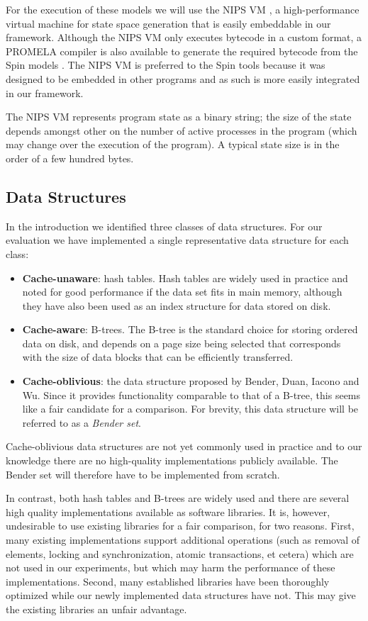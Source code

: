 \documentclass{acm_proc_article-sp}
\begin{document}
For the execution of these models we will use the NIPS VM \cite{weber2007evm}, a
high-performance virtual machine for state space generation that is easily
embeddable in our framework. Although the NIPS VM only executes bytecode in a
custom format, a PROMELA compiler is also available to generate the required
bytecode from the Spin models \cite{nipsvm}. The NIPS VM is preferred to the
Spin tools because it was designed to be embedded in other programs and as
such is more easily integrated in our framework.

The NIPS VM represents program state as a binary string; the size of the state
depends amongst other on the number of active processes in the program (which
may change over the execution of the program).
A typical state size is in the order of a few hundred bytes.

\subsection{Data Structures}
In the introduction we identified three classes of data structures.
For our evaluation we have implemented a single representative data structure
for each class:
\begin{itemize}
\item \textbf{Cache-unaware}: hash tables. Hash tables are widely used in practice and noted for good performance if the data set fits in main memory, although they have also been used as an index structure for data stored on disk.
\item \textbf{Cache-aware}: B-trees. The B-tree is the standard choice for storing ordered data on disk, and depends on a page size being selected that corresponds with the size of data blocks that can be efficiently transferred.
\item \textbf{Cache-oblivious}: the data structure proposed by Bender, Duan, Iacono and Wu. Since it provides functionality comparable to that of a B-tree, this seems like a fair candidate for a comparison. For brevity, this data structure will be referred to as a \emph{Bender set}.
\end{itemize}

Cache-oblivious data structures are not yet commonly used in practice and to
our knowledge there are no high-quality implementations publicly available.
The Bender set will therefore have to be implemented from scratch.

In contrast, both hash tables and B-trees are widely used and there are several
high quality implementations available as software libraries. It is, however,
undesirable to use existing libraries for a fair comparison, for two reasons. First, many existing implementations support additional operations (such as removal of elements, locking and synchronization, atomic transactions, et cetera) which are not used in our experiments, but which may harm the performance of these implementations. Second, many established libraries have been thoroughly optimized while our newly implemented data structures have not. This may give the existing libraries an unfair advantage.
\end{document}

